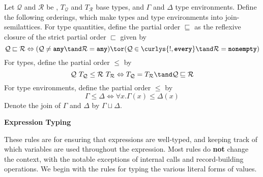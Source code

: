\documentclass[dvipsnames, usenames, sigconf]{acmart}
\begin{document}
\begin{definition}
    Let $\mathcal{Q}$ and $\mathcal{R}$ be \typeQuantities, $T_\mathcal{Q}$ and $T_\mathcal{R}$ base types, and $\Gamma$ and $\Delta$ type environments.
    Define the following orderings, which make types and type environments into join-semilattices.
    For type quantities, define the partial order $\sqsubseteq$ as the reflexive closure of the strict partial order $\sqsubset$ given by
    \[
        \mathcal{Q} \sqsubset \mathcal{R} \iff (\mathcal{Q} \neq \any \tand \mathcal{R} = \any) \tor (\mathcal{Q} \in \curlys{\exactlyone, \every} \tand \mathcal{R} = \nonempty)
    \]
    For types, define the partial order $\leq$ by
    \[
        \mathcal{Q}~T_\mathcal{Q} \leq \mathcal{R}~T_\mathcal{R} \iff T_\mathcal{Q} = T_\mathcal{R} \tand \mathcal{Q} \sqsubseteq \mathcal{R}
    \]
    For type environments, define the partial order $\leq$ by
    \[
        \Gamma \leq \Delta \iff \forall x. \Gamma(x) \leq \Delta(x)
    \]
    Denote the join of $\Gamma$ and $\Delta$ by $\Gamma \sqcup \Delta$.
\end{definition}

 \textbf{Expression Typing}

These rules are for ensuring that expressions are well-typed, and keeping track of which variables are used throughout the expression.
Most rules do \textbf{not} change the context, with the notable exceptions of internal calls and record-building operations.
We begin with the rules for typing the various literal forms of values.
\begin{mathpar}



\end{mathpar}
\end{document}
